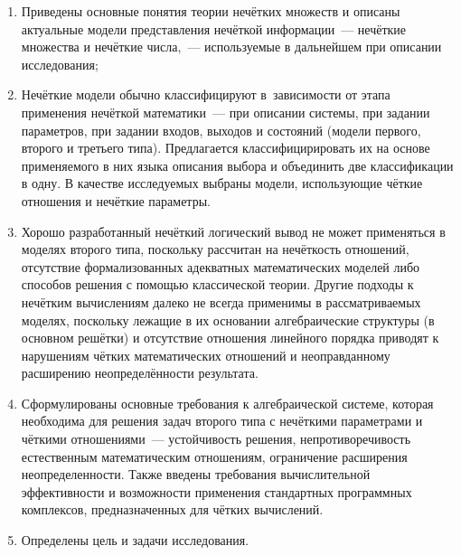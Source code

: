 \begin{enumerate}
  \item Приведены основные понятия теории нечётких множеств и описаны актуальные модели представления нечёткой информации~--- нечёткие множества и нечёткие числа,~--- используемые в дальнейшем при описании исследования;
  \item Нечёткие модели обычно классифицируют в~зависимости от этапа применения нечёткой математики~--- при описании системы, при задании параметров, при задании входов, выходов и состояний (модели первого, второго и третьего типа). Предлагается классифицирировать их на основе применяемого в них языка описания выбора и объединить две классификации в одну. В качестве исследуемых выбраны модели, использующие чёткие отношения и нечёткие параметры.
  \item Хорошо разработанный нечёткий логический вывод не может применяться в моделях второго типа, поскольку рассчитан на нечёткость отношений, отсутствие формализованных адекватных математических моделей либо способов решения с помощью классической теории. Другие подходы к нечётким вычислениям далеко не всегда применимы в рассматриваемых моделях, поскольку лежащие в их основании алгебраические структуры (в основном решётки) и отсутствие отношения линейного порядка приводят к нарушениям чётких математических отношений и неоправданному расширению неопределённости результата.
  \item Сформулированы основные требования к алгебраической системе, которая необходима для решения задач второго типа с нечёткими параметрами и чёткими отношениями~--- устойчивость решения, непротиворечивость естественным математическим отношениям, ограничение расширения неопределенности. Также введены требования вычислительной эффективности и возможности применения стандартных программных комплексов, предназначенных для чётких вычислений.
  \item Определены цель и задачи исследования.
\end{enumerate}
